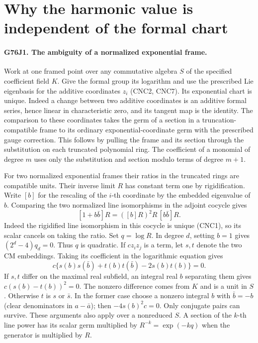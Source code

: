 \section{Why the harmonic value is independent of the formal chart}

\paragraph{G76J1. The ambiguity of a normalized exponential frame.}
Work at one framed point over any commutative algebra $S$ of the
specified coefficient field $K$. Give the formal group its logarithm
and use the prescribed Lie eigenbasis for the additive coordinates
$z_i$ (CNC2, CNC7). Its exponential chart is unique. Indeed a change
between two additive coordinates is an additive formal series, hence
linear in characteristic zero, and its tangent map is the identity.
The comparison to these coordinates takes the germ of a section in a
truncation-compatible frame to its ordinary exponential-coordinate germ
with the prescribed gauge correction. This follows by pulling the frame
and its section through the substitution on each truncated polynomial
ring. The coefficient of a monomial of degree $m$ uses only the
substitution and section modulo terms of degree $m+1$.

For two normalized exponential frames their ratios in the truncated
rings are compatible units. Their inverse limit $R$ has constant term
one by rigidification. Write $[b]$ for the rescaling of the
$i$-th coordinate by the embedded eigenvalue of $b$. Comparing the
two normalized line isomorphisms in the adjoint cocycle gives
\[
 [1+b\bar b]R=([b]R)^2 R\,[b\bar b]R .
\]
Indeed the rigidified line isomorphism in this cocycle is unique
(CNC1), so its scalar cancels on taking the ratio. Set $q=\log R$.
In degree $d$, setting $b=1$ gives $(2^d-4)q_d=0$. Thus $q$ is
quadratic. If $c z_i z_j$ is a term, let $s,t$ denote the two CM
embeddings. Taking its coefficient in the logarithmic equation gives
\[
 c\{s(b)s(\bar b)+t(b)t(\bar b)-2s(b)t(b)\}=0.
\]
If $s,t$ differ on the maximal real subfield, an integral real
$b$ separating them gives $c(s(b)-t(b))^2=0$. The nonzero
difference comes from $K$ and is a unit in $S$. Otherwise $t$ is
$s$ or $\bar s$. In the former case choose a nonzero integral
$b$ with $\bar b=-b$ (clear denominators in $a-\bar a$);
then $-4s(b)^2c=0$. Only conjugate pairs can survive. These
arguments also apply over a nonreduced $S$. A section of the $k$-th
line power has its scalar germ multiplied by $R^{-k}=\exp(-kq)$
when the generator is multiplied by $R$.

